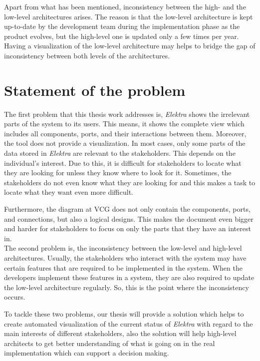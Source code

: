 Apart from what has been mentioned, inconsistency between the high- and the low-level architectures arises. The reason is that the low-level architecture is kept up-to-date by the development team during the implementation phase as the product evolves, but the high-level one is updated only a few times per year. Having a visualization of the low-level architecture may helps to bridge the gap of inconsistency between both levels of the architectures.


\section{Statement of the problem} \label{Statement_ref}
The first problem that this thesis work addresses is, \textit{Elektra} shows the irrelevant parts of the system to its users. This means, it shows the complete view which includes all components, ports, and their interactions between them. Moreover, the tool does not provide a visualization. In most cases, only some parts of the data stored in \textit{Elektra} are relevant to the stakeholders. This depends on the  individual’s interest. Due to this, it is difficult for stakeholders to locate what they are looking for unless they know where to look for it. Sometimes, the stakeholders do not even know what they are looking for and this makes a task to locate what they want even more difficult.

Furthermore, the diagram at VCG does not only contain the components, ports, and connections, but also a logical designs. This makes the document even bigger and harder for stakeholders to focus on only the parts that they have an interest in. \\ 

The second problem is, the inconsistency between the low-level and high-level architectures. Usually, the stakeholders who interact with the system may have certain features that are required to be implemented in the system. When the developers implement these features in a system, they are also required to update the low-level architecture regularly. So, this is the point where the inconsistency occurs. 

To tackle these two problems, our thesis will provide a solution which helps to create automated visualization of the current status of \textit{Elektra} with regard to the main interests of different stakeholders, also the solution will help high-level architects to get better understanding of what is going on in the real implementation which can support a decision making.


